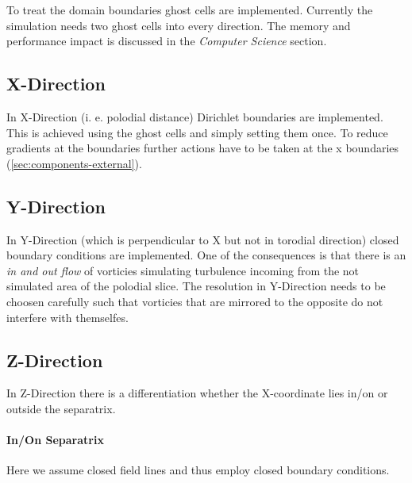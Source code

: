 \documentclass[master.tex]{subfiles}
\begin{document}
To treat the domain boundaries ghost cells are implemented. Currently the simulation needs two ghost cells into every direction. The memory and performance impact is discussed in the \textit{Computer Science} section.
\subsection{X-Direction}
In X-Direction (i. e. polodial distance) Dirichlet boundaries are implemented. This is achieved using the ghost cells and simply setting them once. To reduce gradients at the boundaries further actions have to be taken at the x boundaries (\autoref{sec:components-external}).
\subsection{Y-Direction}
In Y-Direction (which is perpendicular to X but not in torodial direction) closed boundary conditions are implemented. One of the consequences is that there is an \textit{in and out flow} of vorticies simulating turbulence incoming from the not simulated area of the polodial slice. The resolution in Y-Direction needs to be choosen carefully such that vorticies that are mirrored to the opposite do not interfere with themselfes. 
\subsection{Z-Direction}
In Z-Direction there is a differentiation whether the X-coordinate lies in/on or outside the separatrix.
\paragraph{In/On Separatrix}
Here we assume closed field lines and thus employ closed boundary conditions.
\end{document}
